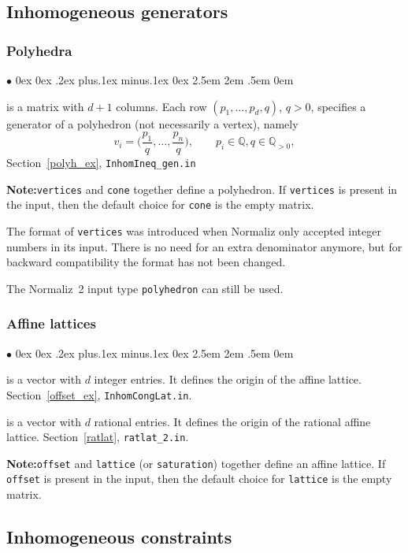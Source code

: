 \documentclass[12pt,a4paper]{scrartcl}
\newcommand{\stdli}{ \topsep0ex \partopsep0ex %
\parsep.2ex plus.1ex minus.1ex \itemsep0ex%
\leftmargin2.5em \labelwidth2em \labelsep.5em \rightmargin0em}%
\renewenvironment{itemize}{\begin{list}{{$\bullet$}}{\stdli}}{\end{list}}
\theoremstyle{definition}
\def\QQ{{\mathbb Q}}
\def\itemtt[#1]{\item[\textbf{\ttt{#1}}]}
\def\ttt{\texttt}
\begin{document}
\subsection{Inhomogeneous generators}

\subsubsection{Polyhedra}

\begin{itemize}
	\itemtt[vertices] is a matrix with $d+1$ columns. Each row $(p_1,\dots,p_d,q)$, $q>0$, specifies a generator of a polyhedron (not necessarily a vertex), namely
	$$
	v_i=\biggl(\frac{p_{1}}{q},\dots,\frac{p_{n}}{q}\biggr), \qquad p_i\in\QQ,q\in\QQ_{>0},
	$$
	Section~\ref{polyh_ex}, \verb|InhomIneq_gen.in|
	
	\textbf{Note:}\enspace \verb|vertices| and \verb|cone| together define a polyhedron. If \verb|vertices| is present in the input, then the default choice for \verb|cone| is the empty matrix.
\end{itemize}

The format of \verb|vertices| was introduced when Normaliz only accepted integer numbers in its input. There is no need for an extra denominator anymore, but for backward compatibility the format has not been changed.

The Normaliz~2 input type \verb|polyhedron| can still be used.

\subsubsection{Affine lattices}

\begin{itemize}
	\itemtt[offset] is a vector with $d$ integer entries. It defines the origin of the affine lattice.
	Section~\ref{offset_ex}, \verb|InhomCongLat.in|.
	
	\itemtt[rational\_offset] is a vector with $d$ rational entries. It defines the origin of the rational affine lattice.
	Section~\ref{ratlat}, \verb|ratlat_2.in|.
\end{itemize}

\textbf{Note:}\enspace \verb|offset| and \verb|lattice| (or \verb|saturation|) together define an affine lattice. If \verb|offset| is present in the input, then the default choice for \verb|lattice| is the empty matrix.

\subsection{Inhomogeneous constraints}
\end{document}
